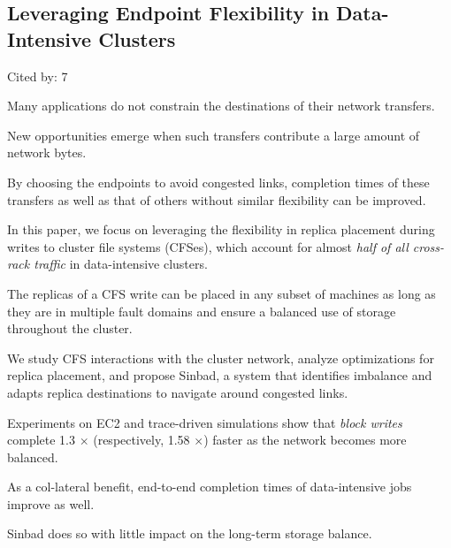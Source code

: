 \documentclass[a4paper,11pt]{article}
\begin{document}
\subsection*{Leveraging Endpoint Flexibility in Data-Intensive Clusters}
{\color{cyan} {\color{magenta} Cited by: 7}

Many applications do not constrain the destinations of their network transfers. 

New opportunities emerge when such transfers contribute a large amount of network bytes. 

By choosing the endpoints to avoid congested links, 
completion times of these transfers as well as that of others without similar flexibility can be improved. 

In this paper, we focus on 
leveraging the flexibility in 
replica placement during writes to cluster file systems (CFSes), 
which account for almost 
{\em half of all cross-rack traffic} 
in data-intensive clusters. 

The replicas of a CFS write can be placed in any subset of machines 
as long as they are in multiple fault domains and ensure a balanced use of storage throughout the cluster.

We study CFS interactions with the cluster network, analyze optimizations for replica placement, and propose 
{\color{black} Sinbad\cite{sinbad}}, 
a system that identifies imbalance and adapts replica destinations to navigate around congested links. 

Experiments on EC2 and trace-driven simulations show that 
{\em block writes} 
complete 1.3 $\times$ (respectively, 1.58 $\times$) faster 
as the network becomes more balanced. 

As a col-lateral benefit, end-to-end completion times of data-intensive jobs improve as well. 

Sinbad does so with little impact on the long-term storage balance.	

}
\end{document}
